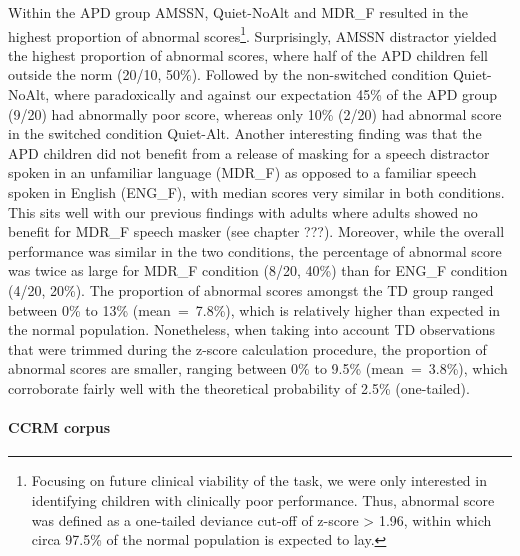 \documentclass[a4paper, twoside]{templates/ociamthesis}
\begin{document}
Within the APD group AMSSN, Quiet-NoAlt and MDR\_F resulted in the highest proportion of abnormal scores\footnote{Focusing on future clinical viability of the task, we were only interested in identifying children with clinically poor performance. Thus, abnormal score was defined as a one-tailed deviance cut-off of z-score \textgreater{} 1.96, within which circa 97.5\% of the normal population is expected to lay.}. Surprisingly, AMSSN distractor yielded the highest proportion of abnormal scores, where half of the APD children fell outside the norm (20/10, 50\%). Followed by the non-switched condition Quiet-NoAlt, where paradoxically and against our expectation 45\% of the APD group (9/20) had abnormally poor score, whereas only 10\% (2/20) had abnormal score in the switched condition Quiet-Alt. Another interesting finding was that the APD children did not benefit from a release of masking for a speech distractor spoken in an unfamiliar language (MDR\_F) as opposed to a familiar speech spoken in English (ENG\_F), with median scores very similar in both conditions. This sits well with our previous findings with adults where adults showed no benefit for MDR\_F speech masker (see chapter ???). Moreover, while the overall performance was similar in the two conditions, the percentage of abnormal score was twice as large for MDR\_F condition (8/20, 40\%) than for ENG\_F condition (4/20, 20\%). The proportion of abnormal scores amongst the TD group ranged between 0\% to 13\% (mean~=~7.8\%), which is relatively higher than expected in the normal population. Nonetheless, when taking into account TD observations that were trimmed during the z-score calculation procedure, the proportion of abnormal scores are smaller, ranging between 0\% to 9.5\% (mean~=~3.8\%), which corroborate fairly well with the theoretical probability of 2.5\% (one-tailed).

\hypertarget{ccrm-corpus}{%
\paragraph*{CCRM corpus}\label{ccrm-corpus}}
\end{document}
